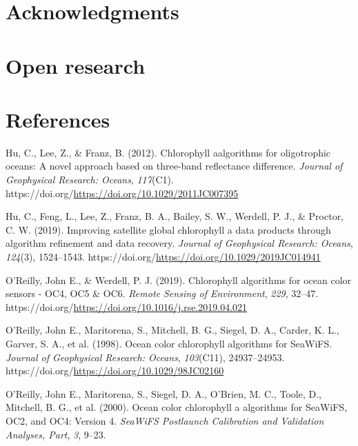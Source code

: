 \documentclass[
]{agujournal2019}
\newlength{\cslhangindent}
\newenvironment{CSLReferences}[2] %
 {\begin{list}{}{%
  \setlength{\itemindent}{0pt}
  \setlength{\leftmargin}{0pt}
  \setlength{\parsep}{0pt}
  \ifodd #1
   \setlength{\leftmargin}{\cslhangindent}
   \setlength{\itemindent}{-1\cslhangindent}
  \fi
  \setlength{\itemsep}{#2\baselineskip}}}
 {\end{list}}
\begin{document}
\section{Acknowledgments}\label{acknowledgments}

\section{Open research}\label{open-research}

\section*{References}\label{references}

\label{refs}
\begin{CSLReferences}{1}{0}
\vspace{1em}

Hu, C., Lee, Z., \& Franz, B. (2012). Chlorophyll aalgorithms for
oligotrophic oceans: A novel approach based on three-band reflectance
difference. \emph{Journal of Geophysical Research: Oceans},
\emph{117}(C1).
https://doi.org/\url{https://doi.org/10.1029/2011JC007395}

Hu, C., Feng, L., Lee, Z., Franz, B. A., Bailey, S. W., Werdell, P. J.,
\& Proctor, C. W. (2019). Improving satellite global chlorophyll a data
products through algorithm refinement and data recovery. \emph{Journal
of Geophysical Research: Oceans}, \emph{124}(3), 1524--1543.
https://doi.org/\url{https://doi.org/10.1029/2019JC014941}

O'Reilly, John E., \& Werdell, P. J. (2019). Chlorophyll algorithms for
ocean color sensors - OC4, OC5 \& OC6. \emph{Remote Sensing of
Environment}, \emph{229}, 32--47.
https://doi.org/\url{https://doi.org/10.1016/j.rse.2019.04.021}

O'Reilly, John E., Maritorena, S., Mitchell, B. G., Siegel, D. A.,
Carder, K. L., Garver, S. A., et al. (1998). Ocean color chlorophyll
algorithms for SeaWiFS. \emph{Journal of Geophysical Research: Oceans},
\emph{103}(C11), 24937--24953.
https://doi.org/\url{https://doi.org/10.1029/98JC02160}

O'Reilly, John E., Maritorena, S., Siegel, D. A., O'Brien, M. C., Toole,
D., Mitchell, B. G., et al. (2000). Ocean color chlorophyll a algorithms
for SeaWiFS, OC2, and OC4: Version 4. \emph{SeaWiFS Postlaunch
Calibration and Validation Analyses, Part}, \emph{3}, 9--23.

\end{CSLReferences}
\end{document}
